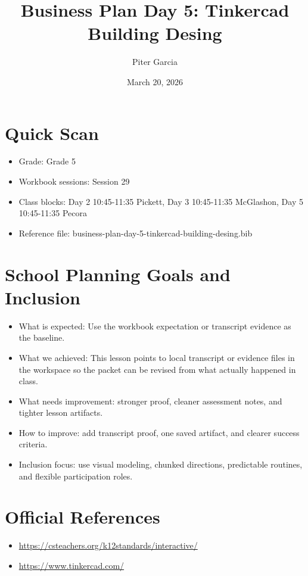\documentclass[11pt]{article}
\title{Business Plan Day 5: Tinkercad Building Desing}
\author{Piter Garcia}
\date{March 20, 2026}
\begin{document}
    \maketitle
    \section*{Quick Scan}
    \begin{itemize}[leftmargin=*]
    \item Grade: Grade 5
    \item Workbook sessions: Session 29
    \item Class blocks: Day 2 10:45-11:35 Pickett, Day 3 10:45-11:35 McGlashon, Day 5 10:45-11:35 Pecora
    \item Reference file: business-plan-day-5-tinkercad-building-desing.bib
    \end{itemize}
    \section*{School Planning Goals and Inclusion}
    \begin{itemize}[leftmargin=*]
    \item What is expected: Use the workbook expectation or transcript evidence as the baseline.
    \item What we achieved: This lesson points to local transcript or evidence files in the workspace so the packet can be revised from what actually happened in class.
    \item What needs improvement: stronger proof, cleaner assessment notes, and tighter lesson artifacts.
    \item How to improve: add transcript proof, one saved artifact, and clearer success criteria.
    \item Inclusion focus: use visual modeling, chunked directions, predictable routines, and flexible participation roles.
    \end{itemize}
    \section*{Official References}
    \begin{itemize}[leftmargin=*]
    \item \url{https://csteachers.org/k12standards/interactive/}
\item \url{https://www.tinkercad.com/}

    \end{itemize}
    
\end{document}
